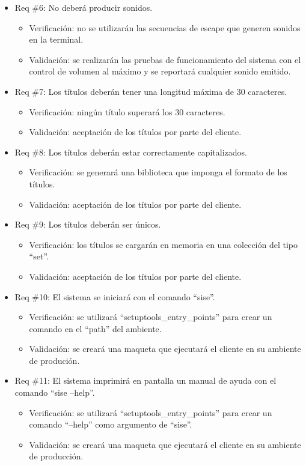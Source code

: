 \documentclass[
11pt, %
]{charter}
\begin{document}
\begin{itemize}
\item Req \#6: No deberá producir sonidos.
\begin{itemize}
    \item Verificación: no se utilizarán las secuencias de escape que generen sonidos en la terminal.
    \item Validación: se realizarán las pruebas de funcionamiento del sistema con el control de volumen al máximo y se reportará cualquier sonido emitido.
\end{itemize}

\item Req \#7: Los títulos deberán tener una longitud máxima de 30 caracteres.
\begin{itemize}
    \item Verificación: ningún título superará los 30 caracteres.
    \item Validación: aceptación de los títulos por parte del cliente.
\end{itemize}

\item Req \#8: Los títulos deberán estar correctamente capitalizados.
\begin{itemize}
    \item Verificación: se generará una biblioteca que imponga el formato de los títulos.
    \item Validación: aceptación de los títulos por parte del cliente.
\end{itemize}

\item Req \#9: Los títulos deberán ser únicos.
\begin{itemize}
    \item Verificación: los títulos se cargarán en memoria en una colección del tipo ``set''.
    \item Validación: aceptación de los títulos por parte del cliente.
\end{itemize}

\item Req \#10: El sistema se iniciará con el comando ``sise''.
\begin{itemize}
    \item Verificación: se utilizará ``setuptools\_entry\_points'' para crear un comando en el ``path'' del ambiente.
    \item Validación: se creará una maqueta que ejecutará el cliente en su ambiente de produción.
\end{itemize}

\item Req \#11: El sistema imprimirá en pantalla un manual de ayuda con el comando ``sise --help''.
\begin{itemize}
    \item Verificación: se utilizará ``setuptools\_entry\_points'' para crear un comando ``--help'' como argumento de ``sise''.
    \item Validación: se creará una maqueta que ejecutará el cliente en su ambiente de producción.
\end{itemize}


\end{itemize}
\end{document}
